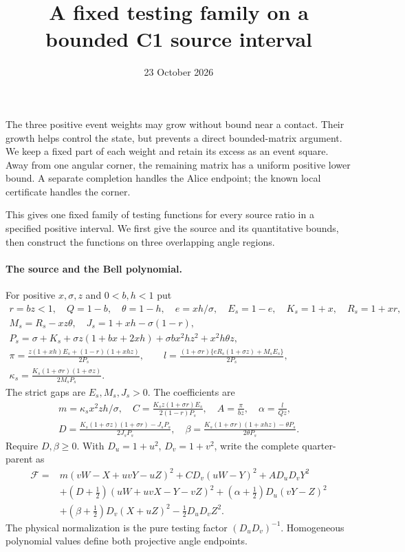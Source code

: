 \documentclass[11pt]{article}
\begin{document}
\title{A fixed testing family on a bounded C1 source interval}
\author{}\date{23 October 2026}\maketitle

The three positive event weights may grow without bound near a contact.
Their growth helps control the state, but prevents a direct bounded-matrix
argument. We keep a fixed part of each weight and retain its excess as an
event square. Away from one angular corner, the remaining matrix has a
uniform positive lower bound. A separate completion handles the Alice
endpoint; the known local certificate handles the corner.

This gives one fixed family of testing functions for every source ratio in
a specified positive interval. We first give the source and its quantitative
bounds, then construct the functions on three overlapping angle regions.

\paragraph{The source and the Bell polynomial.}
For positive $x,\sigma,z$ and $0<b,h<1$ put
\begin{gather*}
 r=bz<1,\quad Q=1-b,\quad\theta=1-h,\quad
 e=xh/\sigma,\quad E_s=1-e,\quad K_s=1+x,\quad R_s=1+xr,\\
 M_s=R_s-xz\theta,\quad J_s=1+xh-\sigma(1-r),\\
 P_s=\sigma+K_s+\sigma z(1+bx+2xh)
                          +\sigma bx^2hz^2+x^2h\theta z,\\
 \pi=\frac{z(1+xh)E_s+(1-r)(1+xhz)}{2P_s},\qquad
 l=\frac{(1+\sigma r)\{eR_s(1+\sigma z)+M_sE_s\}}{2P_s},\\
 \kappa_s=\frac{K_s(1+\sigma r)(1+\sigma z)}{2M_sP_s}.
\end{gather*}
The strict gaps are $E_s,M_s,J_s>0$. The coefficients are
\begin{gather*}
 m=\kappa_s x^2z h/\sigma,\quad
 C=\frac{K_sz(1+\sigma r)E_s}{2(1-r)P_s},\quad
 A=\frac\pi{bz},\quad \alpha=\frac l{Qz},\\
 D=\frac{K_s(1+\sigma z)(1+\sigma r)-J_sP_s}{2J_sP_s},\quad
 \beta=\frac{K_s(1+\sigma r)(1+xhz)-\theta P_s}{2\theta P_s}.
\end{gather*}
Require $D,\beta\ge0$. With $D_u=1+u^2$, $D_v=1+v^2$, write the
complete quarter-parent as
\begin{align*}
 \mathcal F={}&m(vW-X+uvY-uZ)^2+CD_v(uW-Y)^2+AD_uD_vY^2\\
 &+(D+\tfrac12)(uW+uvX-Y-vZ)^2
 +(\alpha+\tfrac12)D_u(vY-Z)^2\\
 &+(\beta+\tfrac12)D_v(X+uZ)^2-\tfrac12D_uD_vZ^2.
\end{align*}
The physical normalization is the pure testing factor $(D_uD_v)^{-1}$.
Homogeneous polynomial values define both projective angle endpoints.
\end{document}
